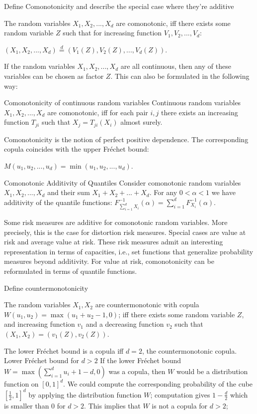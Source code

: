 Define Comonotonicity and describe the special
case where they're additive
    
    
The random variables \(X_1, X_2, ..., X_d\) are comonotonic, 
iff there exists some random variable \(Z\) such that for increasing function \(V_1, V_2, ..., V_d\):
    
\((X_1, X_2, ..., X_d) \stackrel{d}{=} (V_1(Z), V_2(Z), ..., V_d(Z))\).
    
If the random variables \(X_1, X_2, ..., X_d\) are all continuous, 
then any of these variables can be chosen as factor \(Z\). This can also be formulated in the following way:
    
Comonotonicity of continuous random variables
Continuous random variables \(X_1, X_2, ..., X_d\) are comonotonic, 
iff for each pair \(i, j\) there exists an increasing function \(T_{ji}\) 
such that \(X_j = T_{ji}(X_i)\) almost surely.

Comonotonicity is the notion of perfect positive dependence. 
The corresponding copula coincides with the upper Fréchet bound:
    
\(M(u_1, u_2, ..., u_d) = \min(u_1, u_2, ..., u_d)\).



Comonotonic Additivity of Quantiles
Consider comonotonic random variables \(X_1, X_2, ..., X_d\) and their sum \(X_1 + X_2 + ... + X_d\). 
For any \(0 < \alpha < 1\) we have additivity of the quantile functions:
\(F_{\sum_{i = 1}^d X_i}^{-1}(\alpha) = \sum_{i = 1}^d F_{X_i}^{-1}(\alpha).\)

Some risk measures are additive for comonotonic random variables.
More precisely, this is the case for distortion risk measures. Special cases are value at risk and average value at risk.
These risk measures admit an interesting representation in terms of capacities, 
i.e., set functions that generalize probability measures beyond additivity.
For value at risk, comonotonicity can be reformulated in terms of quantile functions.

Define countermonotonicity


The random variables \(X_1, X_2\) are countermonotonic with copula
\(W(u_1, u_2) = \max(u_1 + u_2 - 1, 0)\);
iff there exists some random variable \(Z\), and increasing function \(v_1\) and a decreasing function \(v_2\) such that
\((X_1, X_2) = (v_1(Z), v_2(Z))\).

The lower Fréchet bound is a copula iff \(d = 2\), the countermonotonic copula.
Lower Fréchet bound for \(d > 2\)
If the lower Fréchet bound \(W = \max(\sum_{i = 1}^d u_i + 1 - d, 0)\) was a copula, then \(W\) would be a distribution function on \([0, 1]^d\). 
We could compute the corresponding probability of the cube \([\frac{1}{2}, 1]^d\) by applying the distribution function \(W\); 
computation gives \(1 - \frac{d}{2}\) which is smaller than 0 for \(d > 2\). This implies that \(W\) is not a copula for \(d > 2\);



